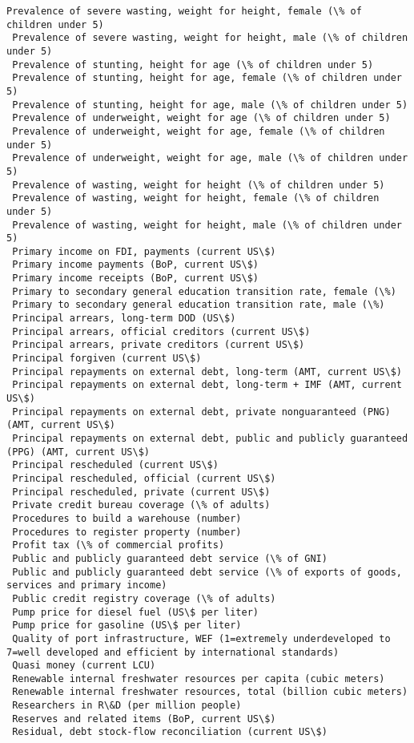 \documentclass[11pt]{article}
\begin{document}
\begin{Verbatim}[commandchars=\\\{\}]
 Prevalence of severe wasting, weight for height, female (\% of children under 5)
 Prevalence of severe wasting, weight for height, male (\% of children under 5)
 Prevalence of stunting, height for age (\% of children under 5)
 Prevalence of stunting, height for age, female (\% of children under 5)
 Prevalence of stunting, height for age, male (\% of children under 5)
 Prevalence of underweight, weight for age (\% of children under 5)
 Prevalence of underweight, weight for age, female (\% of children under 5)
 Prevalence of underweight, weight for age, male (\% of children under 5)
 Prevalence of wasting, weight for height (\% of children under 5)
 Prevalence of wasting, weight for height, female (\% of children under 5)
 Prevalence of wasting, weight for height, male (\% of children under 5)
 Primary income on FDI, payments (current US\$)
 Primary income payments (BoP, current US\$)
 Primary income receipts (BoP, current US\$)
 Primary to secondary general education transition rate, female (\%)
 Primary to secondary general education transition rate, male (\%)
 Principal arrears, long-term DOD (US\$)
 Principal arrears, official creditors (current US\$)
 Principal arrears, private creditors (current US\$)
 Principal forgiven (current US\$)
 Principal repayments on external debt, long-term (AMT, current US\$)
 Principal repayments on external debt, long-term + IMF (AMT, current US\$)
 Principal repayments on external debt, private nonguaranteed (PNG) (AMT, current US\$)
 Principal repayments on external debt, public and publicly guaranteed (PPG) (AMT, current US\$)
 Principal rescheduled (current US\$)
 Principal rescheduled, official (current US\$)
 Principal rescheduled, private (current US\$)
 Private credit bureau coverage (\% of adults)
 Procedures to build a warehouse (number)
 Procedures to register property (number)
 Profit tax (\% of commercial profits)
 Public and publicly guaranteed debt service (\% of GNI)
 Public and publicly guaranteed debt service (\% of exports of goods, services and primary income)
 Public credit registry coverage (\% of adults)
 Pump price for diesel fuel (US\$ per liter)
 Pump price for gasoline (US\$ per liter)
 Quality of port infrastructure, WEF (1=extremely underdeveloped to 7=well developed and efficient by international standards)
 Quasi money (current LCU)
 Renewable internal freshwater resources per capita (cubic meters)
 Renewable internal freshwater resources, total (billion cubic meters)
 Researchers in R\&D (per million people)
 Reserves and related items (BoP, current US\$)
 Residual, debt stock-flow reconciliation (current US\$)

\end{Verbatim}
\end{document}
